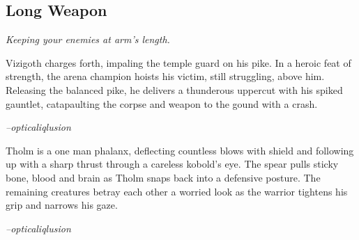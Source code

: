 \subsection{Long Weapon}
\textit{Keeping your enemies at arm's length.}

\begin{quotebox}
Vizigoth charges forth, impaling the temple guard on his pike. In a heroic feat of strength, the arena champion hoists his victim, still struggling, above him. Releasing the balanced pike, he delivers a thunderous uppercut with his spiked gauntlet, catapaulting the corpse and weapon to the gound with a crash.

  \textit{--opticaliqlusion}
\end{quotebox}

\begin{quotebox}
Tholm is a one man phalanx, deflecting countless blows with shield and following up with a sharp thrust through a careless kobold's eye. The spear pulls sticky bone, blood and brain as Tholm snaps back into a defensive posture. The remaining creatures betray each other a worried look as the warrior tightens his grip and narrows his gaze.

  \textit{--opticaliqlusion}
\end{quotebox}
